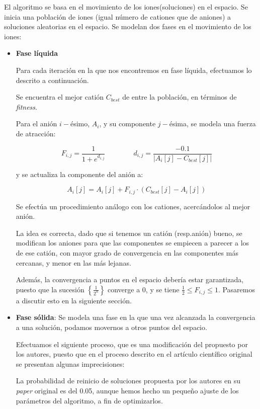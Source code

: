 \documentclass[a4paper,11pt]{article}
\begin{document}
El algoritmo se basa en el movimiento de los iones(soluciones) en el espacio. Se inicia una población de iones (igual número
de cationes que de aniones) a soluciones aleatorias en el espacio.
Se modelan dos fases en el movimiento de los iones:
\begin{itemize}
 \item \textbf{Fase líquida}
 
 Para cada iteración en la que nos encontremos en fase líquida, efectuamos lo descrito a continuación.
 
 Se encuentra el mejor catión $C_{best}$ de entre la población, en términos de \textit{fitness}.
 
 Para el anión $i-$ésimo, $A_i$, y su componente $j-$ésima, se modela una fuerza de atracción:
 
 $$F_{i,j} = \frac{1}{1+e^{d_{i,j}}} \qquad \qquad d_{i,j} = {\frac{-0.1}{|A_{i}[j] - C_{best}[j]|}}$$ 
 
 y se actualiza la componente del anión a:
 
 $$A_i[j] = A_i[j] + F_{i,j} \cdot (C_{best}[j] - A_i[j])$$
 
 Se efectúa un procedimiento análogo con los cationes, acercándolos al mejor anión.
 
 La idea es correcta, dado que si tenemos un catión (resp.anión) bueno, se modifican los aniones para que las componentes se
 empiecen a parecer a los de ese catión, con mayor grado de convergencia en las componentes más cercanas, y menor en las más
 lejanas.
 
 Además, la convergencia a puntos en el espacio debería estar garantizada, puesto que la sucesión $\left\{\frac{1}{2^n}\right\}$ converge
 a 0, y se tiene $ \frac{1}{2} \le F_{i,j} \le 1$. Pasaremos a discutir esto en la siguiente sección.
 
 
 \item \textbf{Fase sólida}: Se modela una fase en la que una vez alcanzada la convergencia a una solución, podamos movernos
 a otros puntos del espacio.
 
 Efectuamos el siguiente proceso, que es una modificación del propuesto por los autores, puesto que en el proceso descrito
 en el artículo científico original se presentan algunas imprecisiones:
 
  \small{\texttt{}}
  \normalsize

 La probabilidad de reinicio de soluciones propuesta por los autores en su \textit{paper} original es del 0.05, aunque hemos
 hecho un pequeño ajuste de los parámetros del algoritmo, a fin de optimizarlos.
 

\end{itemize}
\end{document}
